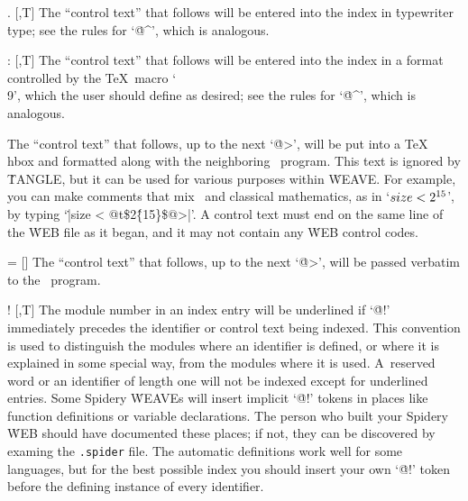 \@.
[\PAS,T] The ``control text'' that follows will be entered into the index
in \.{typewriter} \.{type}; see the rules for `\.{@\^}', which is analogous.

\@: [\PAS,T] The ``control text'' that follows will be entered into the index
in a format controlled by the \TeX\ macro `\.{\\9}', which the user
should define as desired; see the rules for `\.{@\^}', which is analogous.

\@t [\PAS] The ``control text'' that follows, up to the next `\.{@>}', will
be put into a \TeX\ \.{\\hbox} and formatted along with the neighboring
\PASCAL\ program.
This text is ignored by \.{TANGLE}, but it can be used
for various purposes within \.{WEAVE}.
For example, you can make comments
that mix \PASCAL\ and classical mathematics, as in `$\\{size}<2^{15}$', by
typing `\.{|size < @t\$2\^\{15\}\$@>|}'.
A control text must end on the
same line of the \.{WEB} file as it began, and it may not contain any
\.{WEB} control codes.

\@= [\PAS] The ``control text'' that follows, up to the next `\.{@>}', will
be passed verbatim to the \PASCAL\ program.


\@! [\PAS,T] The module number in an index entry will be underlined if `\.{@!}'
immediately precedes the identifier or control text being indexed.
This
convention is used to distinguish the modules where an identifier is
defined, or where it is explained in some special way, from the modules
where it is used.
A~reserved word or an identifier of length one will not
be indexed except for underlined entries.
\newstuff
Some Spidery \.{WEAVE}s will insert implicit `\.{@!}' tokens in places
like function definitions or variable declarations.
The person who built your Spidery \.{WEB} should have documented these
places; if not, they can be discovered by examing the {\tt .spider}
file.
The automatic definitions work well for some languages, but
for the best possible index you should insert your own `\.{@!}' token before
the defining instance of every identifier.
\endnewstuff

